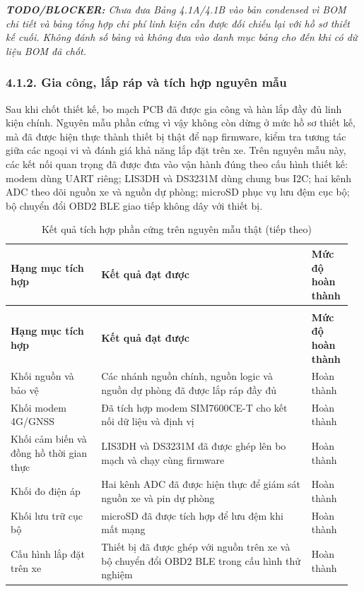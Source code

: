\documentclass[a4paper]{extarticle}
\newcommand{\thesissettableid}[2]{%
  \renewcommand{\thetable}{#1}%
  \renewcommand{\theHtable}{#2}%
}
\begin{document}
\emph{\textbf{TODO/BLOCKER:} Chưa đưa Bảng 4.1A/4.1B vào bản condensed vì BOM chi tiết và bảng tổng hợp chi phí linh kiện cần được đối chiếu lại với hồ sơ thiết kế cuối. Không đánh số bảng và không đưa vào danh mục bảng cho đến khi có dữ liệu BOM đã chốt.}

\subsubsection{4.1.2. Gia công, lắp ráp và tích hợp nguyên mẫu}\label{gia-cuxf4ng-lux1eafp-ruxe1p-vuxe0-tuxedch-hux1ee3p-nguyuxean-mux1eabu}

Sau khi chốt thiết kế, bo mạch PCB đã được gia công và hàn lắp đầy đủ linh kiện
chính. Nguyên mẫu phần cứng vì vậy không còn dừng ở mức hồ sơ thiết kế, mà đã
được hiện thực thành thiết bị thật để nạp firmware, kiểm tra tương tác giữa các
ngoại vi và đánh giá khả năng lắp đặt trên xe. Trên nguyên mẫu này, các kết nối
quan trọng đã được đưa vào vận hành đúng theo cấu hình thiết kế: modem dùng UART
riêng; LIS3DH và DS3231M dùng chung bus I2C; hai kênh ADC theo dõi nguồn xe và
nguồn dự phòng; microSD phục vụ lưu đệm cục bộ; bộ chuyển đổi OBD2 BLE giao tiếp
không dây với thiết bị.

{\thesissettableid{4.2}{condensed-bang-4-2-ket-qua-tich-hop-phan-cung-tren-nguyen-mau-that}
\def\LTcaptype{table}
\begin{longtable}{|L{0.254\linewidth}|L{0.588\linewidth}|L{0.116\linewidth}|}
\caption{Kết quả tích hợp phần cứng trên nguyên mẫu thật}\label{tab:condensed-bang-4-2-ket-qua-tich-hop-phan-cung-tren-nguyen-mau-that}\\
\hline
\textbf{Hạng mục tích hợp} & \textbf{Kết quả đạt được} & \textbf{Mức độ hoàn thành} \\
\hline
\endfirsthead
\caption[]{Kết quả tích hợp phần cứng trên nguyên mẫu thật (tiếp theo)}\\
\hline
\textbf{Hạng mục tích hợp} & \textbf{Kết quả đạt được} & \textbf{Mức độ hoàn thành} \\
\hline
\endhead
\endfoot
\endlastfoot
Khối nguồn và bảo vệ & Các nhánh nguồn chính, nguồn logic và nguồn dự phòng đã được lắp ráp đầy đủ & Hoàn thành \\\hline
Khối modem 4G/GNSS & Đã tích hợp modem SIM7600CE-T cho kết nối dữ liệu và định vị & Hoàn thành \\\hline
Khối cảm biến và đồng hồ thời gian thực & LIS3DH và DS3231M đã được ghép lên bo mạch và chạy cùng firmware & Hoàn thành \\\hline
Khối đo điện áp & Hai kênh ADC đã được hiện thực để giám sát nguồn xe và pin dự phòng & Hoàn thành \\\hline
Khối lưu trữ cục bộ & microSD đã được tích hợp để lưu đệm khi mất mạng & Hoàn thành \\\hline
Cấu hình lắp đặt trên xe & Thiết bị đã được ghép với nguồn trên xe và bộ chuyển đổi OBD2 BLE trong cấu hình thử nghiệm & Hoàn thành \\\hline
\end{longtable}
}
\end{document}
